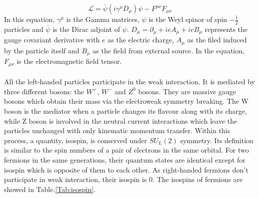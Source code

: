 \begin{equation}
\mathcal{L}=\bar{\psi}(i\gamma^{\mu}D_{\mu})\psi-F^{\mu\nu}F_{\mu\nu}
   \label{Eq:EM Lagrange}  
\end{equation}
In this equation, $\gamma^\mu$ is the Gamma matrices, $\psi$ is the Weyl spinor of spin $-\frac{1}{2}$ particles and $\bar{\psi}$ is the Dirac adjoint of $\psi$. $D_\mu=\partial_\mu+ieA_\mu+ieB_\mu$ represents the gauge covariant derivative with $e$ as the electric charge, $A_\mu$ as the filed induced by the particle itself and $B_\mu$ as the field from external source. In the equation, $F_{\mu\nu}$ is the electromagnetic field tensor. 
\\
\\All the left-handed particles participate in the weak interaction. It is mediated by three different bosons: the $W^+$, $W^-$ and $Z^0$ bosons. They are massive gauge bosons which obtain their mass via the electroweak symmetry breaking. The W boson is the mediator when a particle changes its flavour along with its charge, while Z boson is involved in the neutral current interactions which leave the particles unchanged with only kinematic momentum transfer. Within this process, a quantity, isospin, is conserved under $SU_L(2)$ symmetry. Its definition is similar to the spin numbers of a pair of electrons in the same orbital. For two fermions in the same generations, their quantum states are identical except for isospin which is opposite of them to each other. As right-handed fermions don't participate in weak interaction, their isospin is 0. The isospins of fermions are showed in Table.\ref{Tab:isospin}. 
\\


